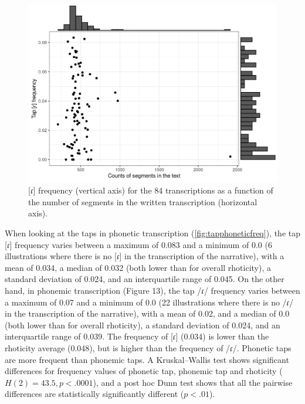 \begin{figure}
	\centering
	\includegraphics[width=0.75\linewidth]{jipa/images/tap_phonetic_freq}
	\caption[\textrm{[ɾ]} frequency for the 84 transcriptions as a function of the number of segments in the written transcription]{\textrm{[ɾ]} frequency (vertical axis) for the 84 transcriptions as a function of the number of segments in the written transcription (horizontal axis).}
	\label{fig:tapphoneticfreq}
\end{figure}

When looking at the taps in phonetic transcription (\autoref{fig:tapphoneticfreq}), the tap [ɾ] frequency varies between a maximum of 0.083 and a minimum of 0.0 (6 illustrations where there is no [ɾ] in the transcription of the narrative), with a mean of 0.034, a median of 0.032 (both lower than for overall rhoticity), a standard deviation of 0.024, and an interquartile range of 0.045. On the other hand, in phonemic transcription (Figure 13), the tap /ɾ/ frequency varies between a maximum of 0.07 and a minimum of 0.0 (22 illustrations where there is no /ɾ/ in the transcription of the narrative), with a mean of 0.02, and a median of 0.0 (both lower than for overall rhoticity), a standard deviation of 0.024, and an interquartile range of 0.039. The frequency of [ɾ] (0.034) is lower than the rhoticity average (0.048), but is higher than the frequency of /ɾ/. Phonetic taps are more frequent than phonemic taps. A Kruskal–Wallis test shows significant differences for frequency values of phonetic tap, phonemic tap and rhoticity ($H(2)=43.5, p<.0001$), and a post hoc Dunn test shows that all the pairwise differences are statistically significantly different ($p<.01$).

